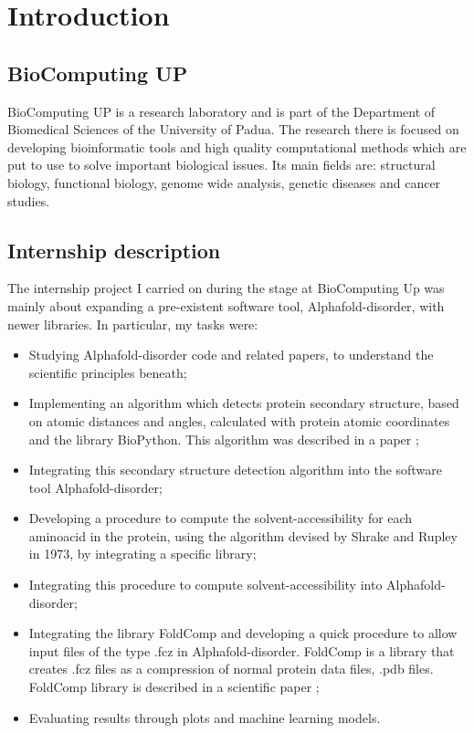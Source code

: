 \chapter{Introduction}
\label{chp:intro}

\section{BioComputing UP}
BioComputing UP is a research laboratory and is part of the Department of Biomedical Sciences of the University of Padua. The research there is focused on developing bioinformatic tools and high quality computational methods which are put to use to solve important biological issues. Its main fields are: structural biology, functional biology, genome wide analysis, genetic diseases and cancer studies.
\section{Internship description}
The internship project I carried on during the stage at BioComputing Up was mainly about expanding a pre-existent software tool, Alphafold-disorder, with newer libraries. In particular, my tasks were:
\begin{itemize}
    \item Studying Alphafold-disorder code and related papers, to understand the scientific principles beneath;
    \item Implementing an algorithm which detects protein secondary structure, based on atomic distances and angles, calculated with protein atomic coordinates and the library BioPython. This algorithm was described in a paper \cite{psea};
    \item Integrating this secondary structure detection algorithm into the software tool Alphafold-disorder;
    \item Developing a procedure to compute the solvent-accessibility for each aminoacid in the protein, using the algorithm devised by Shrake and Rupley in 1973, by integrating a specific library;
    \item Integrating this procedure to compute solvent-accessibility into Alphafold-disorder;
    \item Integrating the library FoldComp and developing a quick procedure to allow input files of the type .fcz in Alphafold-disorder. FoldComp is a library that creates .fcz files as a compression of normal protein data files, .pdb files. FoldComp library is described in a scientific paper \cite{foldcomp};
    \item Evaluating results through plots and machine learning models.
\end{itemize}

